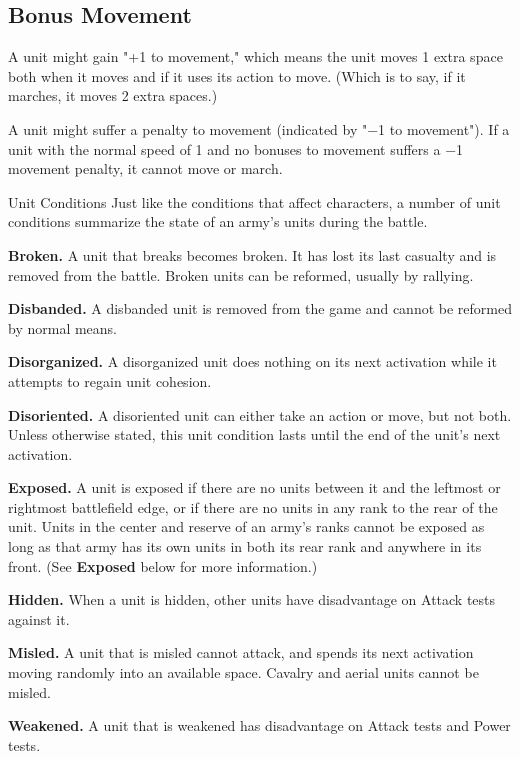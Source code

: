 \documentclass[10pt,a4paper,twoside,bg=print,twocolumn,openany,nodeprecatedcode]{dndbook}
\begin{document}
\subsection{Bonus Movement}
A unit might gain "+1 to movement," which means the unit moves 1 extra space both when it moves and if it uses its action to move. (Which is to say, if it marches, it moves 2 extra spaces.)

A unit might suffer a penalty to movement (indicated by "−1 to movement"). If a unit with the normal speed of 1 and no bonuses to movement suffers a −1 movement penalty, it cannot move or march.

\begin{DndSidebar}[float=!b]{Unit Conditions}
Just like the conditions that affect characters, a number of unit conditions summarize the state of an army's units during the battle.



\textbf{Broken.} A unit that breaks becomes broken. It has lost its last casualty and is removed from the battle. Broken units can be reformed, usually by rallying.



\textbf{Disbanded.} A disbanded unit is removed from the game and cannot be reformed by normal means.



\textbf{Disorganized.} A disorganized unit does nothing on its next activation while it attempts to regain unit cohesion.



\textbf{Disoriented.} A disoriented unit can either take an action or move, but not both. Unless otherwise stated, this unit condition lasts until the end of the unit's next activation.



\textbf{Exposed.} A unit is exposed if there are no units between it and the leftmost or rightmost battlefield edge, or if there are no units in any rank to the rear of the unit. Units in the center and reserve of an army's ranks cannot be exposed as long as that army has its own units in both its rear rank and anywhere in its front. (See \textbf{Exposed} below for more information.)



\textbf{Hidden.} When a unit is hidden, other units have disadvantage on Attack tests against it.



\textbf{Misled.} A unit that is misled cannot attack, and spends its next activation moving randomly into an available space. Cavalry and aerial units cannot be misled.



\textbf{Weakened.} A unit that is weakened has disadvantage on Attack tests and Power tests.



\end{DndSidebar}
\end{document}
